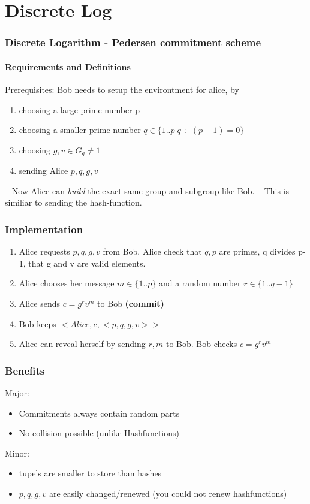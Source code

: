 \section{Discrete Log}
\begin{frame}
	\frametitle{Discrete Logarithm - Pedersen commitment scheme}
	\framesubtitle{Requirements and Definitions}
	Prerequisites: Bob needs to setup the environtment for alice, by 
	\begin{Large}
		\begin{enumerate}
			\item choosing a large prime number p
			\item choosing a smaller prime number $q \in \{1..p| q\div (p-1) = 0\}$
			\item choosing $g,v \in G_q \neq 1$
			\item sending Alice $p,q,g,v$ 
		\end{enumerate}
	\end{Large}
	~\newline
	Now Alice can \textit{build} the exact same group and subgroup like Bob. ~\newline
	This is similiar to sending the hash-function.  
\end{frame}

\begin{frame}
	\frametitle{Implementation}
	\begin{Large}
			\begin{enumerate}
			\item Alice requests $p,q,g,v$ from Bob. Alice check that $q,p$ are primes, q divides p-1, that g and v are valid elements. 
			\item Alice chooses her message $m \in \{1..p\}$ and a random number $r \in \{1..q-1\}$
			\item Alice sends $c = g^rv^m$ to Bob \textbf{(commit)}
			\item Bob keeps $<Alice,c,<p,q,g,v>>$
			\item Alice can reveal herself by sending $r,m$ to Bob. Bob checks $c = g^rv^m$
		\end{enumerate}
	\end{Large}
\end{frame}

\begin{frame}
	\frametitle{Benefits}
	Major:
	\begin{itemize}
		\item Commitments always contain random parts
		\item No collision possible (unlike Hashfunctions)	
	\end{itemize}
	Minor:
	\begin{itemize}
		\item tupels are smaller to store than hashes
		\item $p,q,g,v$ are easily changed/renewed (you could not renew hashfunctions)
	\end{itemize}
\end{frame}
